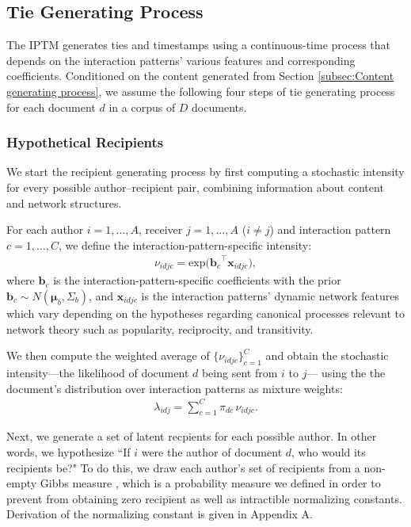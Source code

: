 \documentclass[twoside]{article}
\begin{document}
\subsection{Tie Generating Process}\label{subsec:Tie generating process}
The IPTM generates ties and timestamps using a continuous-time process
that depends on the interaction patterns' various features and
corresponding coefficients. Conditioned on the content generated from Section \ref{subsec:Content generating process}, we assume the following four steps of tie generating process for each document $d$ in a corpus of $D$ documents.

\subsubsection{Hypothetical Recipients}\label{subsubsec:Hypothetical Recipients}
We start the recipient generating process by first computing a stochastic intensity for every possible author--recipient
pair, combining information about content and network structures. 

For each author $i = 1,\ldots,A$, receiver $j = 1,\ldots,A$ ($i \neq j$) and interaction pattern $c=1,\ldots,C$, we define the interaction-pattern-specific intensity:
\begin{align*}
\nu_{idjc} = \mbox{exp}\Big({\boldsymbol{b}_c}^{\top}\boldsymbol{x}_{idjc}\Big),
\end{align*}
where $\boldsymbol{b}_c$ is the interaction-pattern-specific coefficients with the prior $\boldsymbol{b}_c \sim N(\boldsymbol{\mu}_b,\Sigma_b)$, and $\boldsymbol{x}_{idjc}$ is the interaction patterns' dynamic network features which vary depending on the hypotheses regarding canonical processes relevant to network theory such as popularity, reciprocity, and transitivity. 

We then compute the weighted average of $\{\nu_{idjc}\}_{c=1}^C$ and obtain the stochastic intensity---the likelihood of document $d$ being sent from $i$ to $j$--- using the the document's distribution over interaction patterns as mixture weights:
\begin{align*}
\lambda_{idj} =\sum_{c=1}^{C} \pi_{dc}\, \nu_{idjc}.
\end{align*}

Next, we generate a set of latent recpients for each
possible author. In other words, we hypothesize ``If $i$ were the
author of document $d$, who would its recipients be?" To do this, we draw each author's set of recipients from a non-empty Gibbs measure \citep{fellows2017removing}, which is a probability measure we defined in order to prevent from obtaining zero recipient as well as intractible normalizing constants. Derivation of the normalizing constant is given in Appendix A. 
\end{document}
